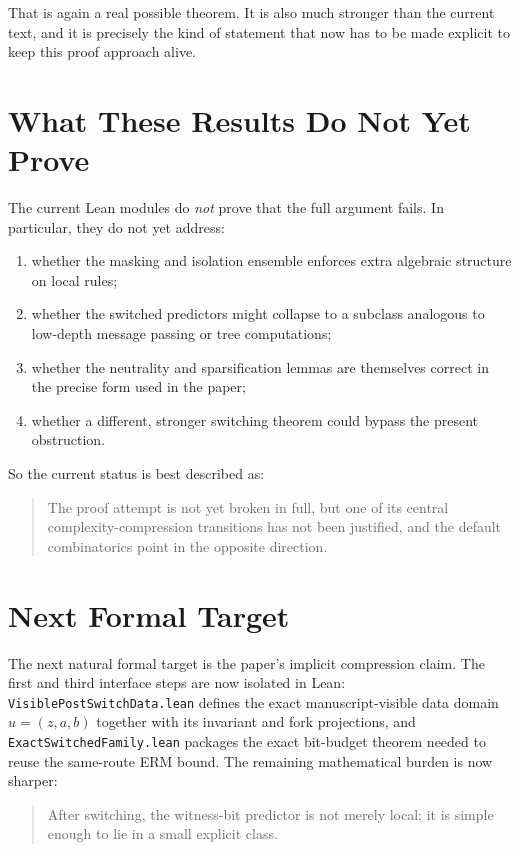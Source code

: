 \documentclass[11pt]{article}
\theoremstyle{remark}
\begin{document}
That is again a real possible theorem.  It is also much stronger than the current text, and it is
precisely the kind of statement that now has to be made explicit to keep this proof approach alive.

\section{What These Results Do Not Yet Prove}

The current Lean modules do \emph{not} prove that the full argument fails.  In particular,
they do not yet address:
\begin{enumerate}[leftmargin=1.5em]
  \item whether the masking and isolation ensemble enforces extra algebraic structure on local rules;
  \item whether the switched predictors might collapse to a subclass analogous to low-depth message
  passing or tree computations;
  \item whether the neutrality and sparsification lemmas are themselves correct in the precise form
  used in the paper;
  \item whether a different, stronger switching theorem could bypass the present obstruction.
\end{enumerate}

So the current status is best described as:
\begin{quote}
The proof attempt is not yet broken in full, but one of its central complexity-compression
transitions has not been justified, and the default combinatorics point in the opposite direction.
\end{quote}

\section{Next Formal Target}

The next natural formal target is the paper's implicit compression claim.  The
first and third interface steps are now isolated in Lean:
\texttt{VisiblePostSwitchData.lean} defines the exact manuscript-visible
data domain \(u=(z,a,b)\) together with its invariant and fork projections, and
\texttt{ExactSwitchedFamily.lean} packages the exact bit-budget theorem needed
to reuse the same-route ERM bound.  The remaining mathematical burden is now
sharper:

\begin{quote}
After switching, the witness-bit predictor is not merely local; it is simple enough to lie in a
small explicit class.
\end{quote}
\end{document}
